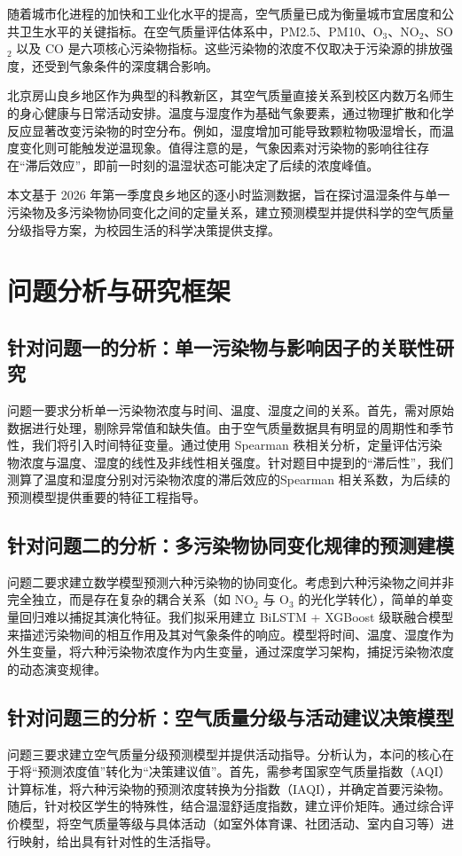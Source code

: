 \documentclass[a4paper, 12pt]{ctexart} %
\begin{document}
随着城市化进程的加快和工业化水平的提高，空气质量已成为衡量城市宜居度和公共卫生水平的关键指标。在空气质量评估体系中，PM2.5、PM10、O$_3$、NO$_2$、SO$_2$ 以及 CO 是六项核心污染物指标。这些污染物的浓度不仅取决于污染源的排放强度，还受到气象条件的深度耦合影响。

北京房山良乡地区作为典型的科教新区，其空气质量直接关系到校区内数万名师生的身心健康与日常活动安排。温度与湿度作为基础气象要素，通过物理扩散和化学反应显著改变污染物的时空分布。例如，湿度增加可能导致颗粒物吸湿增长，而温度变化则可能触发逆温现象。值得注意的是，气象因素对污染物的影响往往存在“滞后效应”，即前一时刻的温湿状态可能决定了后续的浓度峰值。

本文基于 2026 年第一季度良乡地区的逐小时监测数据，旨在探讨温湿条件与单一污染物及多污染物协同变化之间的定量关系，建立预测模型并提供科学的空气质量分级指导方案，为校园生活的科学决策提供支撑。

\section{问题分析与研究框架}

\subsection{针对问题一的分析：单一污染物与影响因子的关联性研究}
问题一要求分析单一污染物浓度与时间、温度、湿度之间的关系。首先，需对原始数据进行处理，剔除异常值和缺失值。由于空气质量数据具有明显的周期性和季节性，我们将引入时间特征变量。通过使用 Spearman 秩相关分析，定量评估污染物浓度与温度、湿度的线性及非线性相关强度。针对题目中提到的“滞后性”，我们测算了温度和湿度分别对污染物浓度的滞后效应的Spearman 相关系数，为后续的预测模型提供重要的特征工程指导。

\subsection{针对问题二的分析：多污染物协同变化规律的预测建模}
问题二要求建立数学模型预测六种污染物的协同变化。考虑到六种污染物之间并非完全独立，而是存在复杂的耦合关系（如 NO$_2$ 与 O$_3$ 的光化学转化），简单的单变量回归难以捕捉其演化特征。我们拟采用建立 BiLSTM + XGBoost 级联融合模型来描述污染物间的相互作用及其对气象条件的响应。模型将时间、温度、湿度作为外生变量，将六种污染物浓度作为内生变量，通过深度学习架构，捕捉污染物浓度的动态演变规律。

\subsection{针对问题三的分析：空气质量分级与活动建议决策模型}
问题三要求建立空气质量分级预测模型并提供活动指导。分析认为，本问的核心在于将“预测浓度值”转化为“决策建议值”。首先，需参考国家空气质量指数（AQI）计算标准，将六种污染物的预测浓度转换为分指数（IAQI），并确定首要污染物。随后，针对校区学生的特殊性，结合温湿舒适度指数，建立评价矩阵。通过综合评价模型，将空气质量等级与具体活动（如室外体育课、社团活动、室内自习等）进行映射，给出具有针对性的生活指导。
\end{document}
